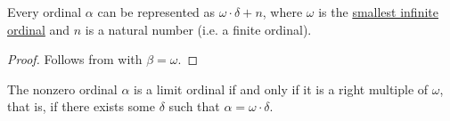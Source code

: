 \begin{corollary}\label{thm:ordinal_division_omega}
  Every ordinal \( \alpha \) can be represented as \( \omega \cdot \delta + n \), where \( \omega \) is the \hyperref[thm:omega_is_an_ordinal]{smallest infinite ordinal} and \( n \) is a natural number (i.e. a finite ordinal).
\end{corollary}
\begin{proof}
  Follows from  with \( \beta = \omega \).
\end{proof}

\begin{proposition}\label{thm:limit_ordinal_division_characterization}
  The nonzero ordinal \( \alpha \) is a limit ordinal if and only if it is a right multiple of \( \omega \), that is, if there exists some \( \delta \) such that \( \alpha = \omega \cdot \delta \).
\end{proposition}

